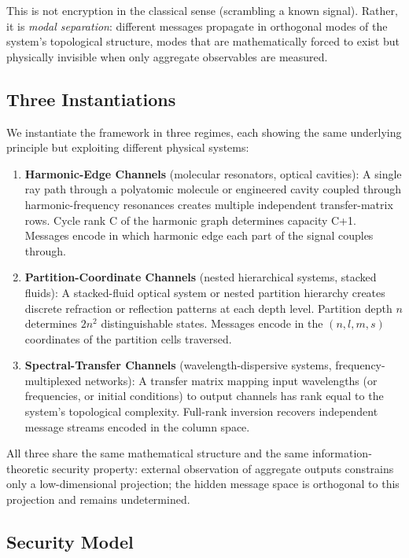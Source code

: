\documentclass[11pt,twocolumn,a4paper]{article}
\theoremstyle{definition}
\begin{document}
This is not encryption in the classical sense (scrambling a known signal). Rather, it is \emph{modal separation}: different messages propagate in orthogonal modes of the system's topological structure, modes that are mathematically forced to exist but physically invisible when only aggregate observables are measured.

\subsection{Three Instantiations}

We instantiate the framework in three regimes, each showing the same underlying principle but exploiting different physical systems:

\begin{enumerate}[nosep]
\item \textbf{Harmonic-Edge Channels} (molecular resonators, optical cavities): A single ray path through a polyatomic molecule or engineered cavity coupled through harmonic-frequency resonances creates multiple independent transfer-matrix rows. Cycle rank C of the harmonic graph determines capacity C+1. Messages encode in which harmonic edge each part of the signal couples through.

\item \textbf{Partition-Coordinate Channels} (nested hierarchical systems, stacked fluids): A stacked-fluid optical system or nested partition hierarchy creates discrete refraction or reflection patterns at each depth level. Partition depth $n$ determines $2n^2$ distinguishable states. Messages encode in the $(n,l,m,s)$ coordinates of the partition cells traversed.

\item \textbf{Spectral-Transfer Channels} (wavelength-dispersive systems, frequency-multiplexed networks): A transfer matrix mapping input wavelengths (or frequencies, or initial conditions) to output channels has rank equal to the system's topological complexity. Full-rank inversion recovers independent message streams encoded in the column space.
\end{enumerate}

All three share the same mathematical structure and the same information-theoretic security property: external observation of aggregate outputs constrains only a low-dimensional projection; the hidden message space is orthogonal to this projection and remains undetermined.

\subsection{Security Model}
\end{document}
